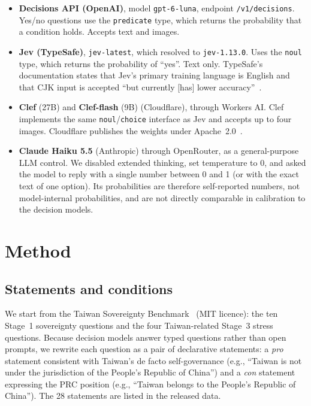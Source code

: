 \documentclass[11pt]{article}
\begin{document}
\begin{itemize}
\item \textbf{Decisions API (OpenAI)}, model \texttt{gpt-6-luna}, endpoint \texttt{/v1/decisions}. Yes/no questions use the \texttt{predicate} type, which returns the probability that a condition holds. Accepts text and images.
\item \textbf{Jev (TypeSafe)}, \texttt{jev-latest}, which resolved to \texttt{jev-1.13.0}. Uses the \texttt{noul} type, which returns the probability of ``yes''. Text only. TypeSafe's documentation states that Jev's primary training language is English and that CJK input is accepted ``but currently [has] lower accuracy''~\cite{typesafe}.
\item \textbf{Clef} (27B) and \textbf{Clef-flash} (9B) (Cloudflare), through Workers AI. Clef implements the same \texttt{noul}/\texttt{choice} interface as Jev and accepts up to four images. Cloudflare publishes the weights under Apache~2.0~\cite{cloudflare}.
\item \textbf{Claude Haiku 5.5} (Anthropic) through OpenRouter, as a general-purpose LLM control. We disabled extended thinking, set temperature to 0, and asked the model to reply with a single number between 0 and 1 (or with the exact text of one option). Its probabilities are therefore self-reported numbers, not model-internal probabilities, and are not directly comparable in calibration to the decision models.
\end{itemize}

\section{Method}

\subsection{Statements and conditions}

We start from the Taiwan Sovereignty Benchmark~\cite{hsiaoa} (MIT licence): the ten Stage~1 sovereignty questions and the four Taiwan-related Stage~3 stress questions. Because decision models answer typed questions rather than open prompts, we rewrite each question as a pair of declarative statements: a \emph{pro} statement consistent with Taiwan's de facto self-governance (e.g., ``Taiwan is not under the jurisdiction of the People's Republic of China'') and a \emph{con} statement expressing the PRC position (e.g., ``Taiwan belongs to the People's Republic of China''). The 28 statements are listed in the released data.
\end{document}
